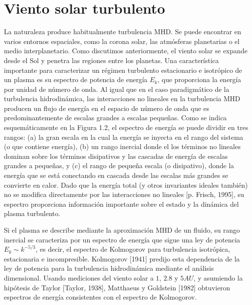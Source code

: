 \section{Viento solar turbulento}

La naturaleza produce habitualmente turbulencia MHD. Se puede
encontrar en varios entornos espaciales, como la corona solar, las
atmósferas planetarias o el medio interplanetario. Como discutimos
anteriormente, el viento solar se expande desde el Sol y penetra las
regiones entre los planetas. Una característica importante para
caracterizar un régimen turbulento estacionario e isotrópico de un
plasma es su espectro de potencia de energía $E_k$, que proporciona la
energía por unidad de número de onda. Al igual que en el caso
paradigmático de la turbulencia hidrodinámica, las interacciones no
lineales en la turbulencia MHD producen un flujo de energía en el
espacio de número de onda que es predominantemente de escalas grandes
a escalas pequeñas. Como se indica esquemáticamente en la Figura 1.2,
el espectro de energía se puede dividir en tres rangos: (a) la gran
escala en la cual la energía se inyecta en el rango del sistema (o que
contiene energía), (b) un rango inercial donde el los términos no
lineales dominan sobre los términos disipativos y las cascadas de
energía de escalas grandes a pequeñas, y (c) el rango de pequeña
escala (o disipativo), donde la energía que se está conectando en
cascada desde las escalas más grandes se convierte en calor. Dado que
la energía total (y otros invariantes ideales también) no se modifica
directamente por las interacciones no lineales [p. Frisch, 1995], su
espectro proporciona información importante sobre el estado y la
dinámica del plasma turbulento.

Si el plasma se describe mediante la aproximación MHD de un fluido, su
rango inercial se caracteriza por un espectro de energía que sigue
una ley de potencia $E_k \sim k^{-5/3}$, es decir, el espectro de
Kolmogorov para turbulencia isotrópica, estacionaria e
incompresible. Kolmogorov [1941] predijo esta dependencia de la ley de
potencia para la turbulencia hidrodinámica mediante el análisis
dimensional. Usando mediciones del viento solar a $1$, $2.8$ y
$\si{5}{AU}$, y asumiendo la hipótesis de Taylor [Taylor, 1938],
Matthaeus y Goldstein [1982] obtuvieron espectros de energía
consistentes con el espectro de Kolmogorov.

